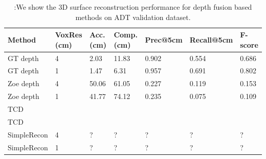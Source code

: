 \begin{table}[]
\centering
\small
\begin{tabular}{|l|l|l|l|l|l|l|}
\hline
Method             & VoxRes (cm) & Acc. (cm) & Comp. (cm) & Prec@5cm & Recall@5cm & F-score \\ \hline
GT depth           & 4                     & 2.03                & 11.83                  & 0.902         & 0.554      & 0.686   \\ \hline
GT depth           & 1                     & 1.47                & 6.31                   & 0.957         & 0.691      & 0.802   \\ \hline
Zoe depth          & 4                     & 50.06               & 61.05                  & 0.227         & 0.119      & 0.153   \\ \hline
Zoe depth          & 1                     & 41.77               & 74.12                  & 0.235         & 0.075      & 0.109   \\ \hline
TCD &                       &                     &                        &               &            &         \\ \hline
TCD &                       &                     &                        &               &            &         \\ \hline
SimpleRecon           & 4                     & ?                & ?                  & ?         & ?      & ?   \\ \hline
SimpleRecon           & 1                     & ?                & ?                  & ?         & ?      & ?   \\ \hline

\end{tabular}
\caption{:We show the 3D surface reconstruction performance for depth fusion based methods on ADT validation dataset.}
\end{table}